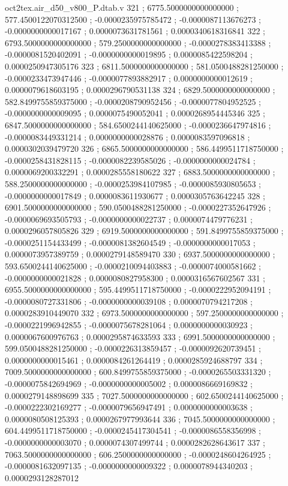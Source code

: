 \begin{filecontents}[overwrite]{oct2tex.air_d50_v800_P.dtab.v}
321 ; 6775.5000000000000000 ; 577.4500122070312500 ; -0.0000235975785472 ; -0.0000087113676273 ; -0.0000000000017167 ; 0.0000073631781561 ; 0.0000340618316841
322 ; 6793.5000000000000000 ; 579.2500000000000000 ; -0.0000278383413388 ; -0.0000081520402091 ; -0.0000000000019895 ; 0.0000085422598204 ; 0.0000250947305176
323 ; 6811.5000000000000000 ; 581.0500488281250000 ; -0.0000233473947446 ; -0.0000077893882917 ; 0.0000000000012619 ; 0.0000079618603195 ; 0.0000296790531138
324 ; 6829.5000000000000000 ; 582.8499755859375000 ; -0.0000208790952456 ; -0.0000077804952525 ; -0.0000000000009095 ; 0.0000075490052041 ; 0.0000268954445346
325 ; 6847.5000000000000000 ; 584.6500244140625000 ; -0.0000236647974816 ; -0.0000083449331214 ; 0.0000000000028876 ; 0.0000083597096818 ; 0.0000302039479720
326 ; 6865.5000000000000000 ; 586.4499511718750000 ; -0.0000258431828115 ; -0.0000082239585026 ; -0.0000000000024784 ; 0.0000069200332291 ; 0.0000285558180622
327 ; 6883.5000000000000000 ; 588.2500000000000000 ; -0.0000253984107985 ; -0.0000085930805653 ; -0.0000000000017849 ; 0.0000083611930677 ; 0.0000305763642245
328 ; 6901.5000000000000000 ; 590.0500488281250000 ; -0.0000227352647926 ; -0.0000069693505793 ; -0.0000000000022737 ; 0.0000074479776231 ; 0.0000296057805826
329 ; 6919.5000000000000000 ; 591.8499755859375000 ; -0.0000251154433499 ; -0.0000081382604549 ; -0.0000000000017053 ; 0.0000073957389759 ; 0.0000279148589470
330 ; 6937.5000000000000000 ; 593.6500244140625000 ; -0.0000210094403883 ; -0.0000074000581662 ; -0.0000000000021828 ; 0.0000080827958300 ; 0.0000316567602567
331 ; 6955.5000000000000000 ; 595.4499511718750000 ; -0.0000222952094191 ; -0.0000080727331806 ; -0.0000000000039108 ; 0.0000070794217208 ; 0.0000283910449070
332 ; 6973.5000000000000000 ; 597.2500000000000000 ; -0.0000221996942855 ; -0.0000075678281064 ; 0.0000000000030923 ; 0.0000067600976763 ; 0.0000295874633593
333 ; 6991.5000000000000000 ; 599.0500488281250000 ; -0.0000226313859457 ; -0.0000092620739451 ; 0.0000000000015461 ; 0.0000084261264419 ; 0.0000285924688797
334 ; 7009.5000000000000000 ; 600.8499755859375000 ; -0.0000265503331320 ; -0.0000075842694969 ; -0.0000000000005002 ; 0.0000086669169832 ; 0.0000279148898699
335 ; 7027.5000000000000000 ; 602.6500244140625000 ; -0.0000222302169277 ; -0.0000079656947491 ; 0.0000000000003638 ; 0.0000080508125393 ; 0.0000267977993644
336 ; 7045.5000000000000000 ; 604.4499511718750000 ; -0.0000245417304541 ; -0.0000086558356998 ; -0.0000000000003070 ; 0.0000074307499744 ; 0.0000282628643617
337 ; 7063.5000000000000000 ; 606.2500000000000000 ; -0.0000248604264925 ; -0.0000081632097135 ; -0.0000000000009322 ; 0.0000078944340203 ; 0.0000293128287012

\end{filecontents}
